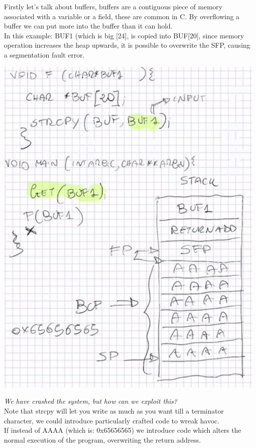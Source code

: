 \documentclass[11pt, oneside]{article}   	%
\begin{document}
Firstly let's talk about buffers, buffers are a contiguous piece of memory associated with a variable or a field, these are common in C. By overflowing a buffer we can put more into the buffer than it can hold.\\
In this example: BUF1 (which is big [24], is copied into BUF[20], since memory operation increases the heap upwards, it is possible to overwrite the SFP, causing a segmentation fault error.
\begin{center}
\includegraphics[scale = 0.5]{memory2}
\end{center}
\emph{We have crashed the system, but how can we exploit this?}\\
Note that strcpy will let you write as much as you want till a terminator character, we could introduce particularly crafted code to wreak havoc.\\
If instead of AAAA (which is: 0x65656565) we introduce code which alters the normal execution of the program, overwriting the return address.\\
\end{document}
